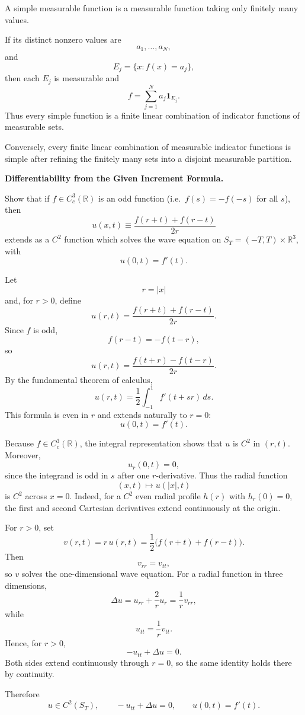 \begin{solution}
A simple measurable function is a measurable function taking only finitely many values.

If its distinct nonzero values are
\[
a_1,\ldots,a_N,
\]
and
\[
E_j=\{x:f(x)=a_j\},
\]
then each \(E_j\) is measurable and
\[
\boxed{
f
=
\sum_{j=1}^{N}
a_j\mathbf1_{E_j}.
}
\]
Thus every simple function is a finite linear combination of indicator functions of measurable
sets.

Conversely, every finite linear combination of measurable indicator functions is simple after
refining the finitely many sets into a disjoint measurable partition.
\end{solution}


\begin{problem}[CP-II-0474]
\label{prob:cp-ii-0474}
\textbf{Differentiability from the Given Increment Formula.}

\hspace*{1.5em}Show that if $f\in C_c^3(\mathbb{R})$ is an odd function
	(i.e.\ $f(s)=-f(-s)$ for all $s$), then
	\[
	u(x,t) \equiv \frac{f(r+t)+f(r-t)}{2r}
	\]
	extends as a $C^2$ function which solves the wave equation on
	$S_T=(-T,T)\times\mathbb{R}^3$, with
	\[
	u(0,t) = f'(t).
	\]
\end{problem}

\begin{solution}
Let
\[
r=|x|
\]
and, for \(r>0\), define
\[
u(r,t)
=
\frac{f(r+t)+f(r-t)}{2r}.
\]
Since \(f\) is odd,
\[
f(r-t)=-f(t-r),
\]
so
\[
u(r,t)
=
\frac{f(t+r)-f(t-r)}{2r}.
\]
By the fundamental theorem of calculus,
\[
\boxed{
u(r,t)
=
\frac12
\int_{-1}^{1}
f'(t+sr)\,ds.
}
\]
This formula is even in \(r\) and extends naturally to \(r=0\):
\[
\boxed{
u(0,t)=f'(t).
}
\]

Because \(f\in C_c^3(\mathbb R)\), the integral representation shows that \(u\) is \(C^2\) in
\((r,t)\). Moreover,
\[
u_r(0,t)=0,
\]
since the integrand is odd in \(s\) after one \(r\)-derivative. Thus the radial function
\[
(x,t)\longmapsto u(|x|,t)
\]
is \(C^2\) across \(x=0\). Indeed, for a \(C^2\) even radial profile \(h(r)\) with
\(h_r(0)=0\), the first and second Cartesian derivatives extend continuously at the origin.

For \(r>0\), set
\[
v(r,t)=r\,u(r,t)
=
\frac12\bigl(f(r+t)+f(r-t)\bigr).
\]
Then
\[
v_{rr}=v_{tt},
\]
so \(v\) solves the one-dimensional wave equation. For a radial function in three dimensions,
\[
\Delta u
=
u_{rr}+\frac2r u_r
=
\frac1r v_{rr},
\]
while
\[
u_{tt}
=
\frac1r v_{tt}.
\]
Hence, for \(r>0\),
\[
-u_{tt}+\Delta u=0.
\]
Both sides extend continuously through \(r=0\), so the same identity holds there by
continuity.

Therefore
\[
\boxed{
u\in C^2(S_T),
\qquad
-u_{tt}+\Delta u=0,
\qquad
u(0,t)=f'(t).
}
\]
\end{solution}


